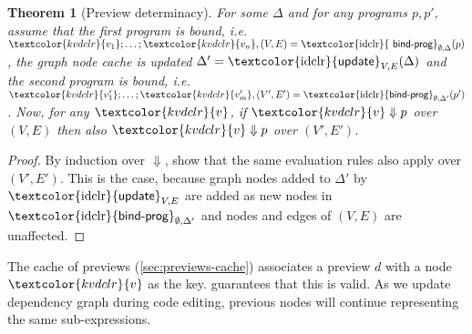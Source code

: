 \documentclass[english,crc,references=cleveref]{programming}
\newcounter{thc}
\theoremstyle{plain}
\newtheorem{theorem}[thc]{Theorem}
\theoremstyle{definition}
\newcommand{\ident}[1]{\textnormal{\textcolor{idclr}{\sffamily #1}}}
\newcommand{\bndclr}[1]{\textcolor{kvdclr}{#1}}
\begin{document}
\begin{theorem}[Preview determinacy]
\label{thm:determinacy}
For some $\Delta$ and for any programs $p, p'$, assume that the first program is bound,
i.\hairspace e.~$\bndclr{v_1};\ldots;\bndclr{v_n}, (V, E) = \ident{bind-prog}_{\emptyset, \Delta}(p)$,
the graph node cache is updated $\Delta' = \ident{update}_{V, E}(\Delta)$ and the second program is
bound, i.\hairspace e.~$\bndclr{v'_1};\ldots;\bndclr{v'_m}, (V', E') = \ident{bind-prog}_{\emptyset, \Delta'}(p')$.
Now, for any $\bndclr{v}$, if $\bndclr{v} \Downarrow p$ over $(V, E)$ then also
 $\bndclr{v} \Downarrow p$ over $(V', E')$.
\end{theorem}
\begin{proof}
By induction over $\Downarrow$, show that the same evaluation rules also
apply over $(V', E')$. This is the case, because graph nodes added to $\Delta'$ by $\ident{update}_{V, E}$
are added as new nodes in $\ident{bind-prog}_{\emptyset, \Delta'}$ and
nodes and edges of $(V, E)$ are unaffected.
\end{proof}
%
%
The cache of previews (\cref{sec:previews-cache}) associates a preview $d$ with a node
$\bndclr{v}$ as the key.  guarantees that this is valid. As we update dependency
graph during code editing, previous nodes will continue representing the same sub-expressions.


\end{document}
